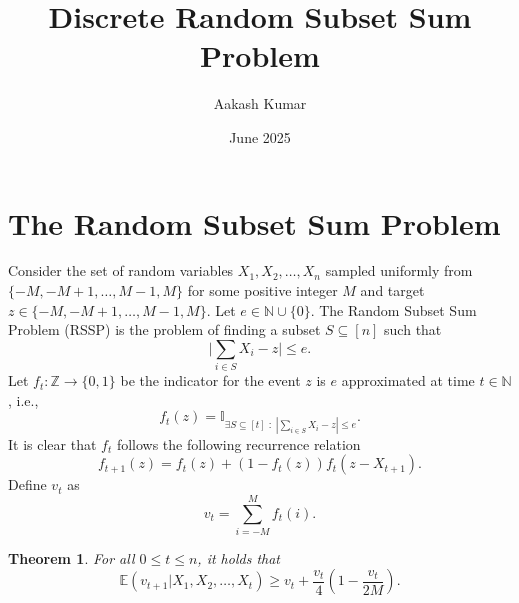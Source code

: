\documentclass{article}
\title{Discrete Random Subset Sum Problem}
\author{Aakash Kumar}
\date{June 2025}
\newtheorem{theorem}{Theorem}
\begin{document}
\maketitle

\section{The Random Subset Sum Problem}
Consider the set of random variables $X_1,X_2,\dots,X_n$ sampled uniformly from $\{-M,-M+1,\dots,M-1,M\}$ for some positive integer $M$ and target $z\in\{-M,-M+1,\dots,M-1,M\}$. Let $e\in\mathbb{N}\cup\{0\}$. The Random Subset Sum Problem (RSSP) is the problem of finding a subset $S\subseteq [n]$ such that
\begin{equation*}
    \big|\sum_{i\in S} X_i - z\big|\leq e.
\end{equation*}
Let $f_t:\mathbb{Z}\to\{0,1\}$ be the indicator for the event $z$ is $e$ approximated at time $t\in\mathbb{N}$, i.e.,
\begin{equation*}
    f_t(z) = \mathbb{I}_{\exists S\subseteq [t]\;:\;|\sum_{i\in S}X_i-z|\leq e}.
\end{equation*}
It is clear that $f_t$ follows the following recurrence relation
\begin{equation*}
    f_{t+1}(z)=f_{t}(z)+(1-f_t(z))f_t(z-X_{t+1}).
\end{equation*}
Define $v_t$ as
\begin{equation*}
    v_t=\sum_{i=-M}^M f_t(i).
\end{equation*}
\begin{theorem}
\label{thm:EVt}
For all $0\leq t \leq n$, it holds that
\begin{equation*}
    \mathbb{E}(v_{t+1}|X_1,X_2,\dots,X_t)\geq v_t+\frac{v_t}{4}\left(1-\frac{v_t}{2M}\right).
\end{equation*}
\end{theorem}
\end{document}
